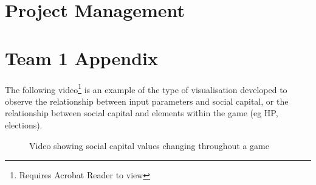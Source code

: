\chapter{Project Management}\label{sec:proj-mgmt}

\chapter{Team 1 Appendix}

The following video\footnote{Requires Acrobat Reader to view} is an example of the type of visualisation developed to observe the relationship between input parameters and social capital, or the relationship between social capital and elements within the game (eg HP, elections).

\begin{figure}[!h]
\begin{frame}{}
  \centering

\end{frame}
\caption{Video showing social capital values changing throughout a game}
  \label{ani:sc_visual_vid}
\end{figure}